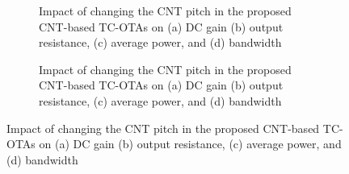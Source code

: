 
\begin{figure}[htbp]
  \centering
  \begin{subfigure}[b]{0.48\linewidth}
    \centering
    \caption{Impact of changing the CNT pitch in the proposed CNT-based TC-OTAs on (a) DC gain (b) output resistance, (c) average power, and (d) bandwidth}

  \end{subfigure}
  \hfill
  \begin{subfigure}[b]{0.48\linewidth}
    \centering
    \caption{Impact of changing the CNT pitch in the proposed CNT-based TC-OTAs on (a) DC gain (b) output resistance, (c) average power, and (d) bandwidth}

  \end{subfigure}
  \caption{Impact of changing the CNT pitch in the proposed CNT-based TC-OTAs on (a) DC gain (b) output resistance, (c) average power, and (d) bandwidth}

  \label{fig:group_eb2xz}
\end{figure}
